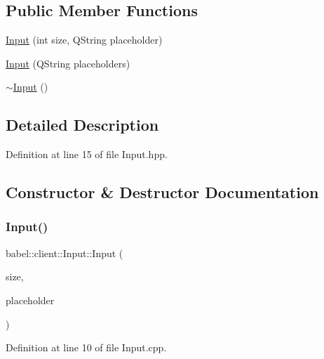 \subsection*{Public Member Functions}
\begin{DoxyCompactItemize}
\item 
\mbox{\hyperlink{classbabel_1_1client_1_1_input_ac4ed6e627494fd65410dfb1333741143}{Input}} (int size, Q\+String placeholder)
\item 
\mbox{\hyperlink{classbabel_1_1client_1_1_input_a8a62b9d25521246c5c48c1e2ec92190f}{Input}} (Q\+String placeholders)
\item 
\mbox{\hyperlink{classbabel_1_1client_1_1_input_a38497832f8053477348959d02832b791}{$\sim$\+Input}} ()
\end{DoxyCompactItemize}


\subsection{Detailed Description}


Definition at line 15 of file Input.\+hpp.



\subsection{Constructor \& Destructor Documentation}
\mbox{\label{classbabel_1_1client_1_1_input_ac4ed6e627494fd65410dfb1333741143}} 
\subsubsection{\texorpdfstring{Input()}{Input()}\hspace{0.1cm}{\footnotesize\ttfamily [1/2]}}
{\footnotesize\ttfamily babel\+::client\+::\+Input\+::\+Input (\begin{DoxyParamCaption}\item[{int}]{size,  }\item[{Q\+String}]{placeholder }\end{DoxyParamCaption})}



Definition at line 10 of file Input.\+cpp.

\mbox{\label{classbabel_1_1client_1_1_input_a8a62b9d25521246c5c48c1e2ec92190f}} 
